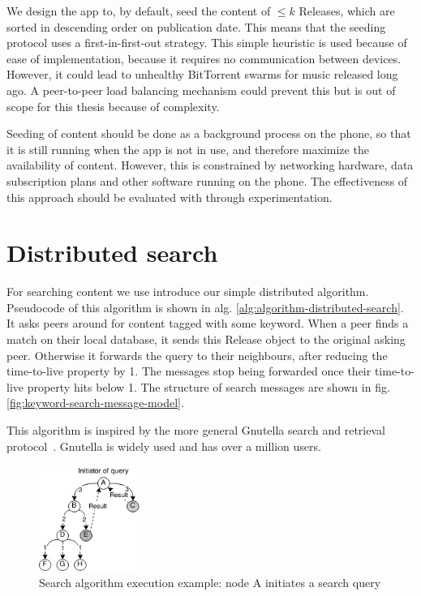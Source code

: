 We design the app to, by default, seed the content of $\leq k$ Releases, which are sorted in descending order on publication date. This means that the seeding protocol uses a first-in-first-out strategy. This simple heuristic is used because of ease of implementation, because it requires no communication between devices. However, it could lead to unhealthy BitTorrent swarms for music released long ago. A peer-to-peer load balancing mechanism could prevent this but is out of scope for this thesis because of complexity.

Seeding of content should be done as a background process on the phone, so that it is still running when the app is not in use, and therefore maximize the availability of content.  However, this is constrained by networking hardware, data subscription plans and other software running on the phone. The effectiveness of this approach should be evaluated with through experimentation.

\section{Distributed search}
For searching content we use introduce our simple distributed algorithm. Pseudocode of this algorithm is shown in alg. \ref{alg:algorithm-distributed-search}. It asks peers around for content tagged with some keyword. When a peer finds a match on their local database, it sends this Release object to the original asking peer. Otherwise it forwards the query to their neighbours, after reducing the time-to-live property by 1. The messages stop being forwarded once their time-to-live property hits below 1. The structure of search messages are shown in fig. \ref{fig:keyword-search-message-model}. 

This algorithm is inspired by the more general Gnutella search and retrieval protocol~\citep{kronfol2002fasd}. Gnutella is widely used and has over a million users.



\begin{figure}
    \centering
    \includegraphics[width=0.3\textwidth]{design/search-algorithm-diagram.png}
    \caption{Search algorithm execution example: node A initiates a search query}
    \label{fig:search-algorithm-diagram}
\end{figure}

